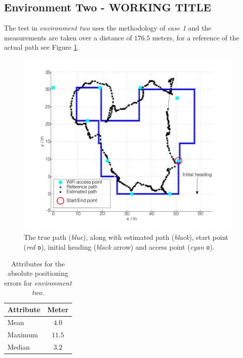 \documentclass{LTHthesis}
\begin{document}
\subsection{Environment Two - WORKING TITLE}
%
The test in \emph{environment two} uses the methodology of \emph{case 1} and the measurements are taken over a distance of $176.5$ meters, for a reference of the actual path see Figure \ref{true_vs_est_env_2_05}.    
%
\begin{figure}[!hbt]

\includegraphics[width=1\textwidth ]{images/pure_rssi/true_vs_est_env_2_05}
\caption{The true path (\emph{blue}), along with estimated path (\emph{black}), start point (\emph{red} \texttt{o}), initial heading (\emph{black} arrow) and access point (\emph{cyan} \texttt{o}).}\label{true_vs_est_env_2_05}
\end{figure}
%
\begin{table}[!hbt]
\begin{center}
\begin{tabular}{|l|c|}
\hline
\multicolumn{1}{|c|}{Attribute} & Meter \\
\hline
\hline
Mean & $4.0$ \\
\hline
Maximum & $11.5$\\
\hline
Median & $3.2$ \\
\hline 
\end{tabular}
\end{center}
\caption{Attributes for the absolute positioning errors for \emph{environment two}.}\label{table:error_env_2}
\end{table}
\end{document}
